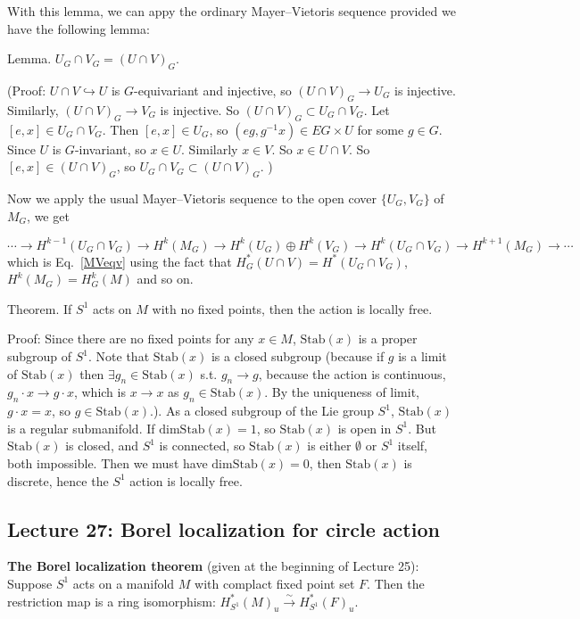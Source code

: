 \documentclass{article}
\theoremstyle{mystyle}
\theoremstyle{remark}
\numberwithin{equation}{section}
\begin{document}
With this lemma, we can appy the ordinary Mayer--Vietoris sequence provided we have the following lemma:

Lemma. $U_G\cap V_G = (U\cap V)_G$. 

(Proof: $U\cap V\hookrightarrow U$ is $G$-equivariant and injective, so $(U\cap V)_G\rightarrow U_G$ is injective. Similarly, $(U\cap V)_G\rightarrow V_G$ is injective. So $(U\cap V)_G \subset U_G\cap V_G$. Let $[e,x]\in U_G\cap V_G$. Then $[e,x]\in U_G$, so $(eg,g^{-1}x) \in EG\times U$ for some $g\in G$. Since $U$ is $G$-invariant, so $x \in U$. Similarly $x\in V$. So $x \in U\cap V$. So $[e,x] \in (U\cap V)_G$, so $U_G\cap V_G\subset (U\cap V)_G$. )

Now we apply the usual Mayer--Vietoris sequence to the open cover $\{U_G,V_G\}$ of $M_G$, we get 

$$\cdots \rightarrow H^{k-1}(U_G\cap V_G) \rightarrow H^k(M_G)\rightarrow H^k(U_G)\oplus H^k(V_G)\rightarrow H^k(U_G\cap V_G)\rightarrow H^{k+1}(M_G)\rightarrow \cdots$$
which is 
Eq.~\eqref{MVeqv} using the fact that $H^*_G(U\cap V) = H^*(U_G\cap V_G)$, $H^k(M_G) = H^k_G(M)$ and so on.


Theorem. If $S^1$ acts on $M$ with no fixed points, then the action is locally free.

Proof: Since there are no fixed points for any $x\in M$, $\mathrm{Stab}(x)$ is a proper subgroup of $S^1$. Note that $\mathrm{Stab}(x)$ is a closed subgroup
(because if $g$ is a limit of $\mathrm{Stab}(x)$ then $\exists g_n\in \mathrm{Stab}(x)$ s.t. $g_n\rightarrow g$, because the action is continuous, $g_n\cdot x \rightarrow g\cdot x$, which is $x\rightarrow x$ as $g_n \in \mathrm{Stab}(x)$. By the uniqueness of limit, $g\cdot x=x$, so $g\in \mathrm{Stab}(x)$.). As a closed subgroup of the Lie group $S^1$, $\mathrm{Stab}(x)$ is a regular submanifold. If $\mathrm{dim}\mathrm{Stab}(x) = 1$, so $\mathrm{Stab}(x)$ is open in $S^1$. But $\mathrm{Stab}(x)$ is closed, and $S^1$ is connected, so $\mathrm{Stab}(x)$ is either $\emptyset$ or $S^1$ itself, both impossible. Then we must have $\mathrm{dim}\mathrm{Stab}(x) = 0$, then $\mathrm{Stab}(x)$ is discrete, hence the $S^1$ action is locally free.




\subsection{Lecture 27: Borel localization for circle action}

\textbf{The Borel localization theorem} (given at the beginning of Lecture 25): Suppose $S^1$ acts on a manifold $M$ with complact fixed point set $F$. Then the restriction map is a ring isomorphism: $H^*_{S^1}(M)_u\xrightarrow{\sim} H^*_{S^1}(F)_u$.
\end{document}
